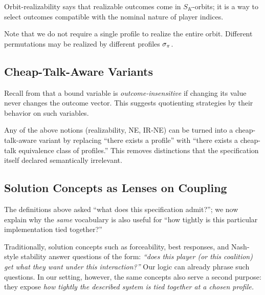 Orbit-realizability says that realizable outcomes come in $S_K$-orbits; it is a
way to select outcomes compatible with the nominal nature of player indices.

Note that we do not require a single profile to realize the entire orbit.
Different permutations may be realized by different profiles $\sigma_\pi$.

\subsection{Cheap-Talk-Aware Variants}
\label{subsec:ct-aware}

Recall from  that a bound variable is
\emph{outcome-insensitive} if changing its value never changes the outcome
vector. This suggests quotienting strategies by their behavior on such
variables.


Any of the above notions (realizability, NE, IR-NE) can be turned into a
cheap-talk-aware variant by replacing ``there exists a profile'' with ``there
exists a cheap-talk equivalence class of profiles.'' This removes distinctions
that the specification itself declared semantically irrelevant.

\subsection{Solution Concepts as Lenses on Coupling}
\label{subsec:solution-lens}

The definitions above asked ``what does this specification admit?''; we now
explain why the \emph{same} vocabulary is also useful for ``how tightly is this
particular implementation tied together?''

Traditionally, solution concepts such as forceability, best responses, and
Nash-style stability answer questions of the form:
\emph{``does this player (or this coalition) get what they want under this
interaction?''} Our logic can already phrase such questions. In our setting,
however, the same concepts also serve a second purpose: they expose
\emph{how tightly the described system is tied together at a chosen profile.}

